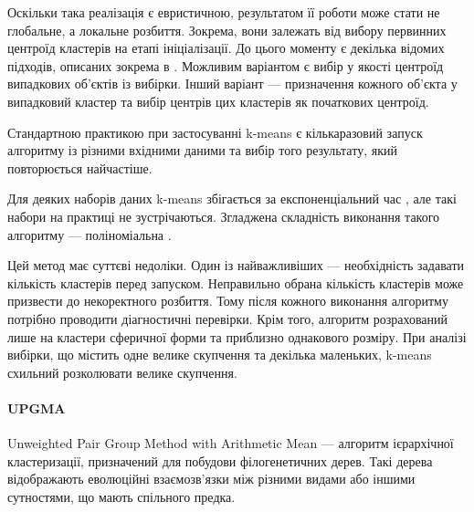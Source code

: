             Оскільки така реалізація є евристичною, результатом її роботи може стати не глобальне, а локальне розбиття. Зокрема, вони залежать від вибору первинних центроїд кластерів на етапі ініціалізації. До цього моменту є декілька відомих підходів, описаних зокрема в \cite{HamerlyKMeansOptimization}. Можливим варіантом є вибір у якості центроїд випадкових об'єктів із вибірки. Інший варіант --- призначення кожного об'єкта у випадковий кластер та вибір центрів цих кластерів як початкових центроїд.
            
            Стандартною практикою при застосуванні k-means є кількаразовий запуск алгоритму із різними вхідними даними та вибір того результату, який повторюється найчастіше.
            
            Для деяких наборів даних k-means збігається за експоненціальний час \cite{KMeansWorstCaseComplexity}, але такі набори на практиці не зустрічаються. Згладжена складність виконання такого алгоритму --- поліноміальна \cite{KMeansSmoothedComplexity}. 
            
            Цей метод має суттєві недоліки. Один із найважливіших --- необхідність задавати кількість кластерів перед запуском. Неправильно обрана кількість кластерів може призвести до некоректного розбиття. Тому після кожного виконання алгоритму потрібно проводити діагностичні перевірки. Крім того, алгоритм розрахований лише на кластери сферичної форми та приблизно однакового розміру. При аналізі вибірки, що містить одне велике скупчення та декілька маленьких, k-means схильний розколювати велике скупчення.
            
        \paragraph {UPGMA}
            Unweighted Pair Group Method with Arithmetic Mean --- алгоритм ієрархічної кластеризації, призначений для побудови філогенетичних дерев. Такі дерева відображають еволюційні взаємозв'язки між різними видами або іншими сутностями, що мають спільного предка.
            
